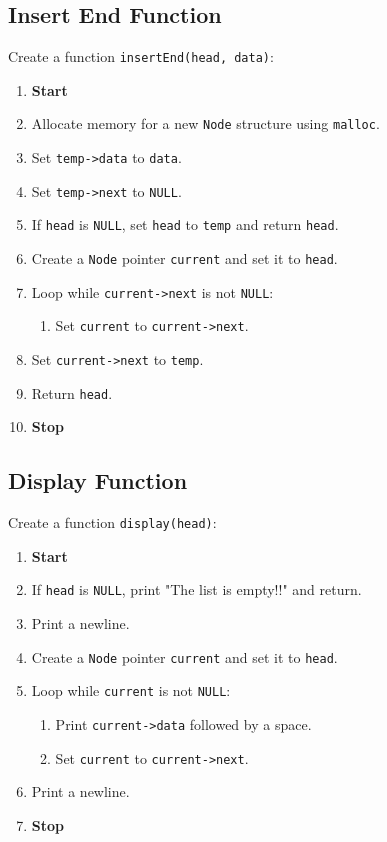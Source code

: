 {  \subsection{Insert End Function}
  Create a function \texttt{insertEnd(head, data)}:
  \begin{enumerate}[label=\arabic*:,left=0pt]
    \item \textbf{Start}
    \item Allocate memory for a new \texttt{Node} structure using \texttt{malloc}.
    \item Set \texttt{temp->data} to \texttt{data}.
    \item Set \texttt{temp->next} to \texttt{NULL}.
    \item If \texttt{head} is \texttt{NULL}, set \texttt{head} to \texttt{temp} and return \texttt{head}.
    \item Create a \texttt{Node} pointer \texttt{current} and set it to \texttt{head}.
    \item Loop while \texttt{current->next} is not \texttt{NULL}:
          \begin{enumerate}[label=2.\arabic*:, start=1]
            \item Set \texttt{current} to \texttt{current->next}.
          \end{enumerate}
    \item Set \texttt{current->next} to \texttt{temp}.
    \item Return \texttt{head}.
    \item \textbf{Stop}
  \end{enumerate}

  \subsection{Display Function}
  Create a function \texttt{display(head)}:
  \begin{enumerate}[label=\arabic*:,left=0pt]
    \item \textbf{Start}
    \item If \texttt{head} is \texttt{NULL}, print "The list is empty!!" and return.
    \item Print a newline.
    \item Create a \texttt{Node} pointer \texttt{current} and set it to \texttt{head}.
    \item Loop while \texttt{current} is not \texttt{NULL}:
          \begin{enumerate}[label=2.\arabic*:, start=1]
            \item Print \texttt{current->data} followed by a space.
            \item Set \texttt{current} to \texttt{current->next}.
          \end{enumerate}
    \item Print a newline.
    \item \textbf{Stop}
  \end{enumerate}

}

